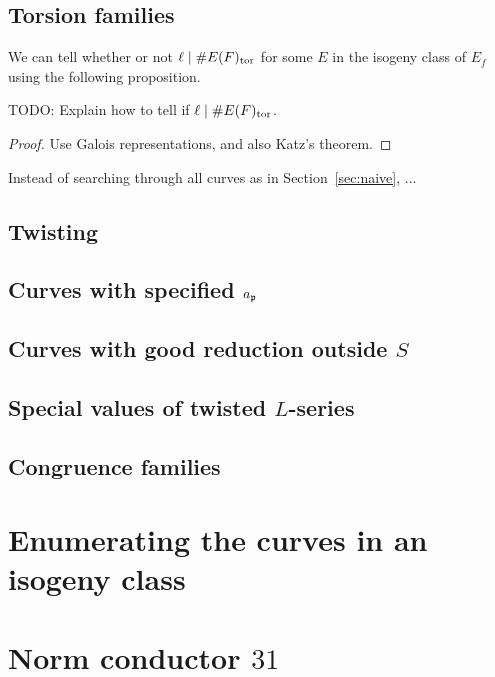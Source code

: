\documentclass{article}
\begin{document}
\subsection{Torsion families}\label{sec:torsion}

We can tell whether or not $\ell\mid \#E(F)_{\operatorname{tor}}$ for some
$E$ in the isogeny class of $E_f$ using the following proposition.

\begin{proposition}
 TODO: Explain how to tell if $\ell\mid \#E(F)_{\operatorname{tor}}$.
\end{proposition}
\begin{proof}
  Use Galois representations, and also Katz's theorem.
\end{proof}

Instead of searching through all curves as in Section~\ref{sec:naive},
...


\subsection{Twisting}

\subsection{Curves with specified $a_{\mathfrak{p}}$}

\subsection{Curves with good reduction outside $S$}

\subsection{Special values of twisted $L$-series}

\subsection{Congruence families}

\section{Enumerating the curves in an isogeny class}

\section{Norm conductor $31$}\label{sec:31}
\end{document}
